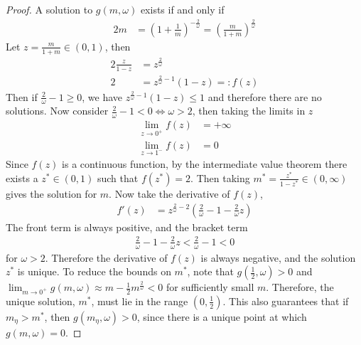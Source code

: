 \documentclass[10pt]{article}
\begin{document}
\begin{proof}
    A solution to $g(m,\omega)$ exists if and only if
    \begin{align*}
        2m &= (1+\frac{1}{m})^{-\frac{2}{\omega}}= (\frac{m}{1+m})^{\frac{2}{\omega}}
    \end{align*}
    Let $z = \frac{m}{1+m} \in (0,1)$, then 
    \begin{align*}
        2\frac{z}{1-z} &= z^{\frac{2}{\omega}}\\
        2 &= z^{\frac{2}{\omega}-1}(1-z)=: f(z)
    \end{align*}
    Then if $\frac{2}{\omega}-1 \geq 0$, we have $z^{\frac{2}{\omega}-1}(1-z) \leq 1$ and therefore there are no solutions. Now consider $\frac{2}{\omega} -1 < 0 \Leftrightarrow \omega > 2$, then taking the limits in $z$
    \begin{align*}
        \lim_{z\rightarrow0^+} f(z) &= +\infty\\
        \lim_{z\rightarrow1^-} f(z) &= 0
    \end{align*}
    Since $f(z)$ is a continuous function, by the intermediate value theorem there exists a $z^* \in (0,1)$ such that $f(z^*) = 2$. Then taking $m^* = \frac{z^*}{1-z^*} \in (0,\infty)$ gives the solution for $m$. Now take the derivative of $f(z)$, 
    \begin{align*}
        f'(z) &=z^{\frac{2}{\omega}-2}(\frac{2}{\omega}-1 - \frac{2}{\omega}z)
    \end{align*}
    The front term is always positive, and the bracket term
    \begin{align*}
        \frac{2}{\omega}-1 - \frac{2}{\omega}z <  \frac{2}{\omega}-1  < 0
    \end{align*}
    for $\omega>2$. Therefore the derivative of $f(z)$ is always negative, and the solution $z^*$ is unique. To reduce the bounds on $m^*$, note that $g(\frac{1}{2},\omega) >0$ and $\lim_{m\rightarrow0^+} g(m,\omega) \approx m - \frac{1}{2}m^{\frac{2}{\omega}}<0$ for sufficiently small $m$. Therefore, the unique solution, $m^*$, must lie in the range $(0,\frac{1}{2})$. This also guarantees that if $m_\eta > m^*$, then $g(m_\eta,\omega)>0$, since there is a unique point at which $g(m,\omega)=0$.
\end{proof}
\end{document}
